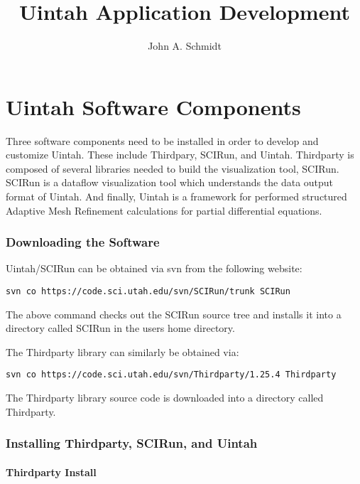 \documentclass[12pt]{report}
\begin{document}
\title{Uintah Application Development}

\author{John A. Schmidt}

\maketitle

\tableofcontents

\chapter{Uintah Software Components}

Three software components need to be installed in order to develop and
customize Uintah.  These include Thirdpary, SCIRun, and Uintah.
Thirdparty is composed of several libraries needed to build the
visualization tool, SCIRun.  SCIRun is a dataflow visualization tool
which understands the data output format of Uintah.  And finally,
Uintah is a framework for performed structured Adaptive Mesh
Refinement calculations for partial differential equations.

\subsection{Downloading the Software}

Uintah/SCIRun can be obtained via svn from the following website:
\begin{verbatim}
svn co https://code.sci.utah.edu/svn/SCIRun/trunk SCIRun
\end{verbatim}

The above command checks out the SCIRun source tree and installs it
into a directory called SCIRun in the users home directory.

The Thirdparty library can similarly be obtained via:
\begin{verbatim}
svn co https://code.sci.utah.edu/svn/Thirdparty/1.25.4 Thirdparty
\end{verbatim}

The Thirdparty library source code is downloaded into a directory
called Thirdparty.

\subsection{Installing Thirdparty, SCIRun, and Uintah}

\subsubsection{Thirdparty Install}
\end{document}
